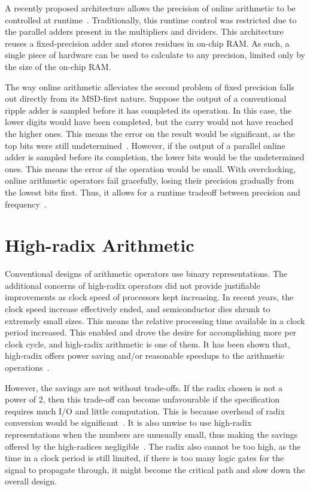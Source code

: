 A recently proposed architecture allows the precision of online arithmetic to be controlled at runtime~\cite{Zhao1}.
Traditionally, this runtime control was restricted due to the parallel adders present in the multipliers and dividers.
This architecture reuses a fixed-precision adder and stores residues in on-chip RAM.
As such, a single piece of hardware can be used to calculate to any precision, limited only by the size of the on-chip RAM.

The way online arithmetic alleviates the second problem of fixed precision falls out directly from its MSD-first nature.
Suppose the output of a conventional ripple adder is sampled before it has completed its operation.
In this case, the lower digits would have been completed, but the carry would not have reached the higher ones.
This means the error on the result would be significant, as the top bits were still undetermined~\cite{Shi1}.
However, if the output of a parallel online adder is sampled before its completion, the lower bits would be the undetermined ones.
This means the error of the operation would be small.
With overclocking, online arithmetic operators fail gracefully, losing their precision gradually from the lowest bits first.
Thus, it allows for a runtime tradeoff between precision and frequency~\cite{Shi2}.

\section{High-radix Arithmetic}
Conventional designs of arithmetic operators use binary representations.
The additional concerns of high-radix operators did not provide justifiable improvements as clock speed of processors kept increasing.
In recent years, the clock speed increase effectively ended, and semiconductor dies shrunk to extremely small sizes.
This means the relative processing time available in a clock period increased.
This enabled and drove the desire for accomplishing more per clock cycle, and high-radix arithmetic is one of them.
It has been shown that, high-radix offers power saving and/or reasonable speedups to the arithmetic operations~\cite{Catanzaro1}\cite{Amin1}\cite{Chen1}.

However, the savings are not without trade-offs.
If the radix chosen is not a power of 2, then this trade-off can become unfavourable if the specification requires much I/O and little computation.
This is because overhead of radix conversion would be significant~\cite{Whyte1}.
It is also unwise to use high-radix representations when the numbers are unusually small, thus making the savings offered by the high-radices negligible~\cite{Catanzaro1}.
The radix also cannot be too high, as the time in a clock period is still limited, if there is too many logic gates for the signal to propagate through, it might become the critical path and slow down the overall design.

